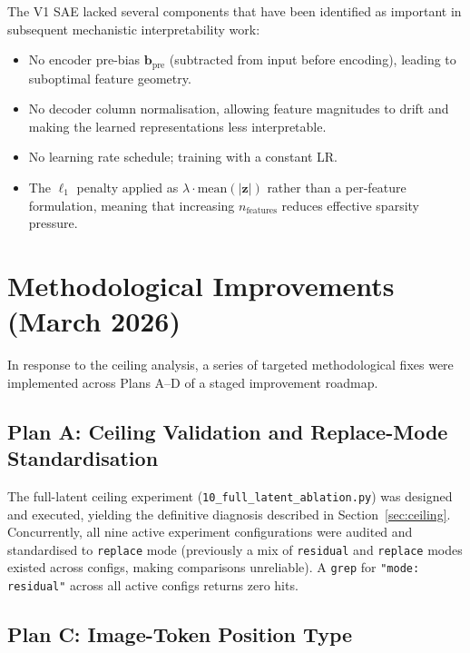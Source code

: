 \documentclass[11pt,a4paper]{article}
\begin{document}
The V1 SAE lacked several components that have been identified as important in subsequent
mechanistic interpretability work:
\begin{itemize}[noitemsep]
  \item No encoder pre-bias $\mathbf{b}_{\mathrm{pre}}$ (subtracted from input before encoding),
    leading to suboptimal feature geometry.
  \item No decoder column normalisation, allowing feature magnitudes to drift and making
    the learned representations less interpretable.
  \item No learning rate schedule; training with a constant LR.
  \item The $\ell_1$ penalty applied as $\lambda \cdot \mathrm{mean}(|\mathbf{z}|)$ rather than a
    per-feature formulation, meaning that increasing $n_{\mathrm{features}}$ reduces effective
    sparsity pressure.
\end{itemize}


\section{Methodological Improvements (March 2026)}
\label{sec:fixes}

In response to the ceiling analysis, a series of targeted methodological fixes were implemented
across Plans A--D of a staged improvement roadmap.

\subsection{Plan A: Ceiling Validation and Replace-Mode Standardisation}

The full-latent ceiling experiment (\texttt{10\_full\_latent\_ablation.py}) was designed and
executed, yielding the definitive diagnosis described in Section~\ref{sec:ceiling}.
Concurrently, all nine active experiment configurations were audited and standardised to
\texttt{replace} mode (previously a mix of \texttt{residual} and \texttt{replace} modes existed
across configs, making comparisons unreliable).
A \texttt{grep} for \texttt{"mode: residual"} across all active configs returns zero hits.

\subsection{Plan C: Image-Token Position Type}
\end{document}
